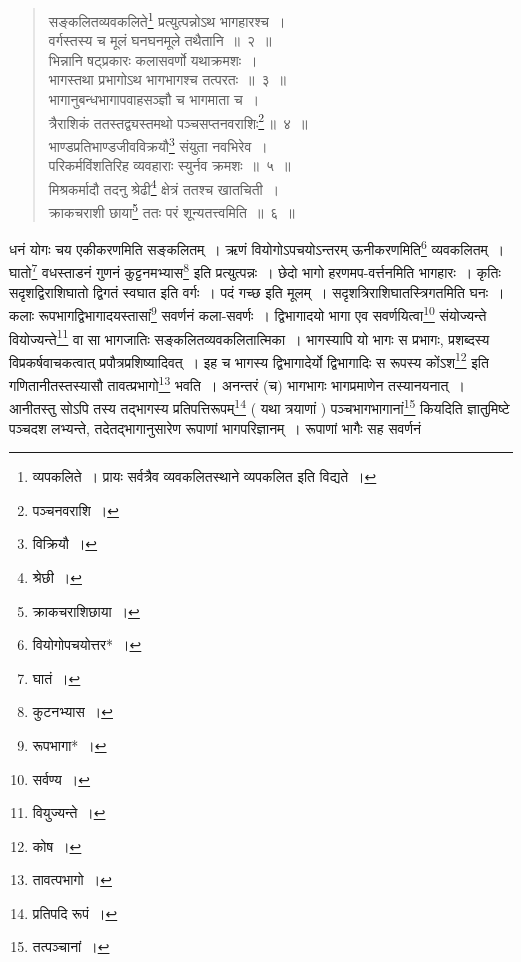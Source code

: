 \documentclass[10pt, openany]{book}
\begin{document}
 \label{Vish}
\begin{quote}
    
 {\bs सङ्कलितव्यवकलिते\renewcommand{\thefootnote}{\s २}\footnote{\s व्यपकलिते~। प्रायः सर्वत्रैव
व्यवकलितस्थाने व्यपकलित इति 
विद्यते~।} प्रत्युत्पन्नोऽथ भागहारश्च~। \\
 वर्गस्तस्य च मूलं घनघनमूले तथैतानि~॥~२~॥ \\
 भिन्नानि षट्प्रकारः कलासवर्णो यथाक्रमशः~। \\
 भागस्तथा प्रभागोऽथ भागभागश्च तत्परतः~॥~३~॥ \\
 भागानुबन्धभागापवाहसञ्ज्ञौ च भागमाता च~। \\
 त्रैराशिकं ततस्तद्व्यस्तमथो पञ्चसप्तनवराशिः\renewcommand{\thefootnote}{\s ३}\footnote{\s  पञ्चनवराशि~।}\,॥~४~॥ \\
 भाण्डप्रतिभाण्डजीवविक्रयौ\renewcommand{\thefootnote}{\s ४}\footnote{\s  विक्रियौ~।} संयुता नवभिरेव~। \\
 परिकर्मविंशतिरिह व्यवहाराः स्युर्नव क्रमशः~॥~५~॥ \\
 मिश्रकर्मादौ तदनु श्रेढी\renewcommand{\thefootnote}{\s ५}\footnote{\s  श्रेछी~।} क्षेत्रं ततश्च खातचिती~। \\
 क्राकचराशी छाया\renewcommand{\thefootnote}{\s ६}\footnote{\s  क्राकचराशिछाया~।} ततः परं शून्यतत्त्वमिति~॥~६~॥ }\end{quote}

{धनं योगः चय एकीकरणमिति सङ्कलितम्~। ऋणं वियोगोऽपचयोऽन्तरम् ऊनीकरणमिति\renewcommand{\thefootnote}{\s ७}\footnote{\s  वियोगोपचयोत्तर*~।} 
व्यवकलितम्~। घातो\renewcommand{\thefootnote}{\s ८}\footnote{\s  घातं~।} वधस्ताडनं गुणनं कुट्टनमभ्यास\renewcommand{\thefootnote}{\s ९}\footnote{\s  कुटनभ्यास~।} 
इति प्रत्युत्पन्नः~।}
{छेदो भागो हरणमप-वर्त्तनमिति भागहारः~। कृतिः सदृशद्विराशिघातो द्विगतं
स्वघात}
{इति वर्गः~। पदं गच्छ इति मूलम्~। सदृशत्रिराशिघातस्त्रिगतमिति घनः~। कलाः
रूपभागद्विभागादयस्तासां\renewcommand{\thefootnote}{\s १०}\footnote{\s रूपभागा*~।}  सवर्णनं कला-सवर्णः~। द्विभागादयो भागा एव
सवर्णयित्वा\renewcommand{\thefootnote}{\s ११}\footnote{\s सर्वण्य~।}  संयोज्यन्ते}
{वियोज्यन्ते\renewcommand{\thefootnote}{\s १२}\footnote{\s  वियुज्यन्ते~।}  वा सा भागजातिः} {सङ्कलितव्यवकलितात्मिका~। भागस्यापि
यो भागः स}
{प्रभागः, प्रशब्दस्य विप्रकर्षवाचकत्वात् प्रपौत्रप्रशिष्यादिवत्~। इह च
भागस्य द्विभागादेर्यो}
{द्विभागादिः स रूपस्य कोंऽश\renewcommand{\thefootnote}{\s १३}\footnote{\s  कोष~।}  इति गणितानीतस्तस्यासौ
तावत्प्रभागो\renewcommand{\thefootnote}{\s १४}\footnote{\s तावत्पभागो~।}  भवति~। अनन्तरं}
{(च) भागभागः भागप्रमाणेन तस्यानयनात्~। आनीतस्तु सोऽपि तस्य तद्भागस्य
प्रतिपत्तिरूपम्\renewcommand{\thefootnote}{\s १५}\footnote{\s  प्रतिपदि रूपं~।}  ( यथा त्रयाणां ) पञ्चभागभागानां\renewcommand{\thefootnote}{\s १६}\footnote{\s तत्पञ्चानां~।}  कियदिति
ज्ञातुमिष्टे पञ्चदश}
{लभ्यन्ते, तदेतद्भागानुसारेण रूपाणां भागपरिज्ञानम्~। रूपाणां भागैः सह
सवर्णनं}
\end{document}
